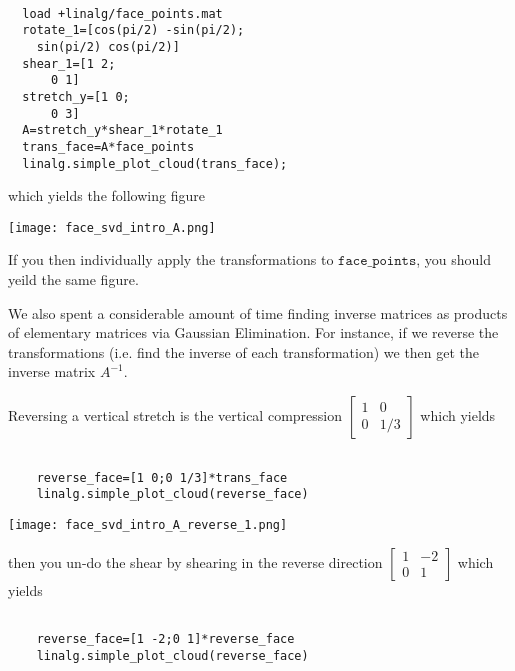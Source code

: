 \documentclass{ximera}
\begin{document}
\begin{verbatim}

  load +linalg/face_points.mat
  rotate_1=[cos(pi/2) -sin(pi/2);
    sin(pi/2) cos(pi/2)]
  shear_1=[1 2;
      0 1]
  stretch_y=[1 0;
      0 3]
  A=stretch_y*shear_1*rotate_1
  trans_face=A*face_points
  linalg.simple_plot_cloud(trans_face);

\end{verbatim}

which yields the following figure 

\begin{center}
  \texttt{[image: face\_svd\_intro\_A.png]}
\end{center}

If you then individually apply the transformations to $\texttt{face\_points}$, you should yeild the same figure. 

We also spent a considerable amount of time finding inverse matrices as products of elementary matrices via Gaussian Elimination. For instance, if we reverse the transformations (i.e. find the inverse of each transformation) we then get the inverse matrix $A^{-1}$.

Reversing a vertical stretch is the vertical compression $\begin{bmatrix}1 &0\\
  0 &1/3\end{bmatrix}$ which yields

  \begin{verbatim}

    reverse_face=[1 0;0 1/3]*trans_face
    linalg.simple_plot_cloud(reverse_face)

  \end{verbatim}

\begin{center}
  \texttt{[image: face\_svd\_intro\_A\_reverse\_1.png]}
\end{center}

then you un-do the shear by shearing in the reverse direction $\begin{bmatrix}1 &-2\\
  0 &1\end{bmatrix}$ which yields 

  \begin{verbatim}

    reverse_face=[1 -2;0 1]*reverse_face
    linalg.simple_plot_cloud(reverse_face)

  \end{verbatim}
\end{document}
